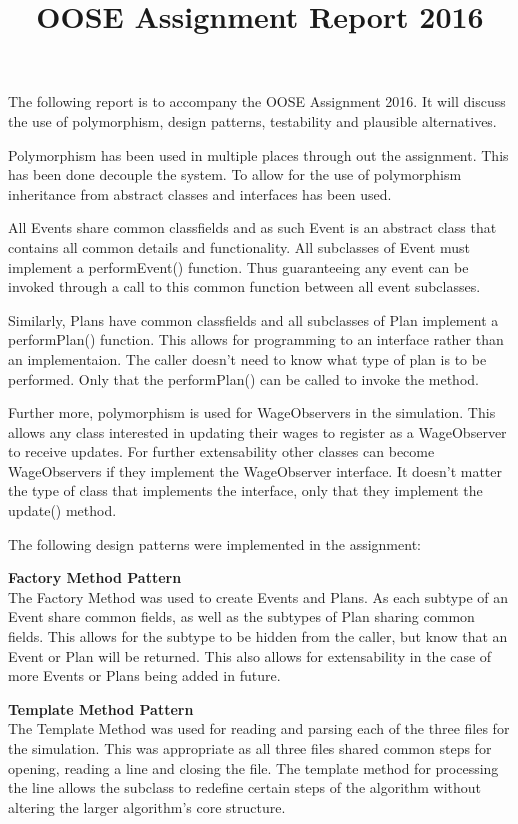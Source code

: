 \documentclass{worksheet}
\title{OOSE Assignment Report 2016}
\begin{document}
	The following report is to accompany the OOSE Assignment 2016. It will discuss the use of polymorphism, design patterns, testability and plausible alternatives. 
	
	
     
	Polymorphism has been used in multiple places through out the assignment. This has been done decouple the system. To allow for the use of polymorphism inheritance from abstract classes and interfaces has been used. 
	
	All Events share common classfields and as such Event is an abstract class that contains all common details and functionality. All subclasses of Event must implement a performEvent() function. Thus guaranteeing any event can be invoked through a call to this common function between all event subclasses.  
	
	Similarly, Plans have common classfields and all subclasses of Plan implement a performPlan() function. This allows for programming to an interface rather than an implementaion. The caller doesn't need to know what type of plan is to be performed. Only that the performPlan() can be called to invoke the method.
	
	Further more, polymorphism is used for WageObservers in the simulation. This allows any class interested in updating their wages to register as a WageObserver to receive updates. For further extensability other classes can become WageObservers if they implement the WageObserver interface. It doesn't matter the type of class that implements the interface, only that they implement the update() method. 
\pagebreak
	
	The following design patterns were implemented in the assignment: 
	
	\textbf{Factory Method Pattern\\}
	The Factory Method was used to create Events and Plans. As each subtype of an Event share common fields, as well as the subtypes of Plan sharing common fields. This allows for the subtype to be hidden from the caller, but know that an Event or Plan will be returned. This also allows for extensability in the case of more Events or Plans being added in future.
	\vspace{0.5cm}
	
	
	
	\textbf{Template Method Pattern\\}
	The Template Method was used for reading and parsing each of the three files for the simulation. This was appropriate as all three files shared common steps for opening, reading a line and closing the file. The template method for processing the line allows the subclass to redefine certain steps of the algorithm without altering the larger algorithm's core structure.
	
\end{document}
